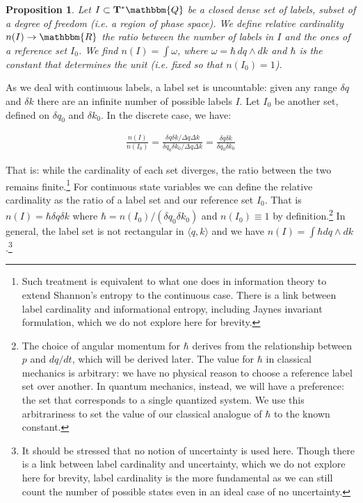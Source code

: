 \documentclass[aps,pra,10pt,twocolumn,floatfix,nofootinbib]{revtex4-1}
\newtheorem{prop}[thm]{Proposition}
\theoremstyle{definition}
\begin{document}
\begin{prop}\label{relativeCardinality}
Let $I \subset \mathbf{T}^*\mathbbm{Q}$ be a closed dense set of labels, subset of a degree of freedom (i.e. a region of phase space). We define \emph{relative cardinality} $n(I) \rightarrow \mathbbm{R}$ the ratio between the number of labels in $I$ and the ones of a reference set $I_0$. We find $n(I)=\int \omega$, where $\omega = \hbar \, dq \wedge dk$ and $\hbar$ is the constant that determines the unit (i.e. fixed so that $n(I_0) = 1$).
\end{prop}

As we deal with continuous labels, a label set is uncountable: given any range $\delta q$ and $\delta k$ there are an infinite number of possible labels $I$. Let $I_0$ be another set, defined on $\delta q_0$ and $\delta k_0$. In the discrete case, we have:

\begin{align*}
\frac{n(I)}{n(I_0)} = \frac{\delta q \delta k / \Delta q \Delta k}{\delta q_0 \delta k_0 / \Delta q \Delta k} = \frac{\delta q \delta k}{\delta q_0 \delta k_0}
\end{align*}

That is: while the cardinality of each set diverges, the ratio between the two remains finite.\footnote{Such treatment is equivalent to what one does in information theory to extend Shannon's entropy\cite{Shannon} to the continuous case. There is a link between label cardinality and informational entropy, including Jaynes\cite{Jaynes} invariant formulation, which we do not explore here for brevity.} For continuous state variables we can define the relative cardinality as the ratio of a label set and our reference set $I_0$. That is $n(I)=\hbar \delta q \delta k$ where $\hbar=n(I_0)/(\delta q_0 \delta k_0)$ and $n(I_0)\equiv1$ by definition.\footnote{The choice of angular momentum for $\hbar$ derives from the relationship between $p$ and $dq/dt$, which will be derived later. The value for $\hbar$ in classical mechanics is arbitrary: we have no physical reason to choose a reference label set over another. In quantum mechanics, instead, we will have a preference: the set that corresponds to a single quantized system. We use this arbitrariness to set the value of our classical analogue of $\hbar$ to the known constant.} In general, the label set is not rectangular in $\langle q,k \rangle$ and we have $n(I)=\int \hbar dq \wedge dk$.\footnote{It should be stressed that no notion of uncertainty is used here. Though there is a link between label cardinality and uncertainty, which we do not explore here for brevity, label cardinality is the more fundamental as we can still count the number of possible states even in an ideal case of no uncertainty.}
\end{document}
